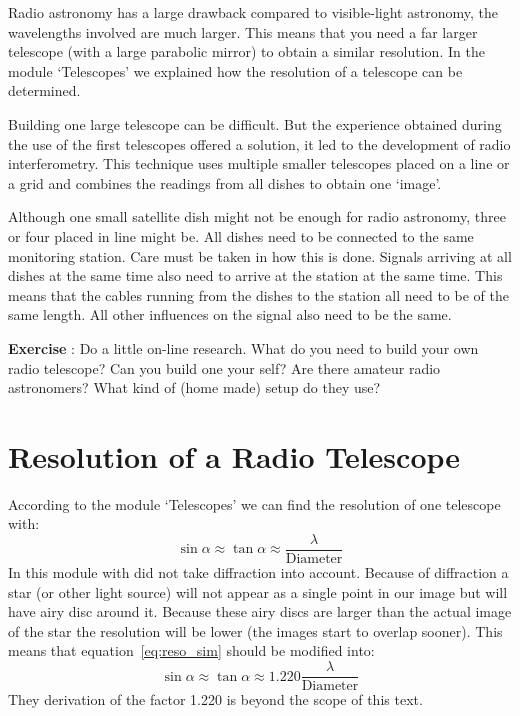 Radio astronomy has a large drawback compared to visible-light astronomy, the wavelengths involved are much larger. This means that you need a far larger telescope (with a large parabolic mirror) to obtain a similar resolution. In the module `Telescopes' we explained how the resolution of a telescope can be determined.

Building one large telescope can be difficult. But the experience obtained during the use of the first telescopes offered a solution, it led to the development of radio interferometry. This technique uses multiple smaller telescopes placed on a line or a grid and combines the readings from all dishes to obtain one `image'.

Although one small satellite dish might not be enough for radio astronomy, three or four placed in line might be. All dishes need to be connected to the same monitoring station. Care must be taken in how this is done. Signals arriving at all dishes at the same time also need to arrive at the station at the same time. This means that the cables running from the dishes to the station all need to be of the same length. All other influences on the signal also need to be the same.

\begin{shaded}
\textbf{Exercise \theExercise {}} : Do a little on-line research. What do you need to build your own radio telescope? Can you build one your self? Are there amateur radio astronomers? What kind of (home made) setup do they use?\end{shaded}

\section{Resolution of a Radio Telescope}
According to the module `Telescopes' we can find the resolution of one telescope with:
\begin{equation}
\sin \alpha \approx \tan \alpha \approx \frac{\lambda}{\mbox{Diameter}} \label{eq:reso_sim}
\end{equation}
In this module with did not take diffraction into account. Because of diffraction a star (or other light source) will not appear as a single point in our image but will have airy disc around it. Because these airy discs are larger than the actual image of the star the resolution will be lower (the images start to overlap sooner). This means that equation~\ref{eq:reso_sim} should be modified into:
\begin{equation}
\sin \alpha \approx \tan \alpha \approx 1.220 \frac{\lambda}{\mbox{Diameter}} \label{eq:reso}
\end{equation}
They derivation of the factor 1.220 is beyond the scope of this text. 

